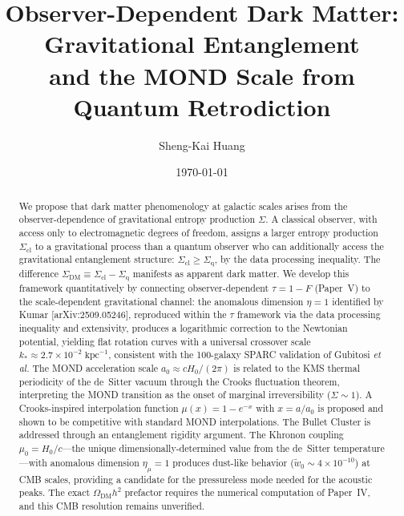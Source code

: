 \documentclass[prd,twocolumn,superscriptaddress,longbibliography,floatfix]{revtex4-2}
\newcommand{\tauasym}{\tau}
\begin{document}
\title{Observer-Dependent Dark Matter: Gravitational Entanglement\\
and the MOND Scale from Quantum Retrodiction}

\author{Sheng-Kai Huang}

\date{\today}

\begin{abstract}
We propose that dark matter phenomenology at galactic scales
arises from the observer-dependence of gravitational entropy
production $\Sigma$.
A classical observer, with access only to electromagnetic
degrees of freedom, assigns a larger entropy production
$\Sigma_{\mathrm{cl}}$ to a gravitational process than a
quantum observer who can additionally access the gravitational
entanglement structure: $\Sigma_{\mathrm{cl}} \geq
\Sigma_{\mathrm{q}}$, by the data processing inequality.
The difference $\Sigma_{\mathrm{DM}} \equiv
\Sigma_{\mathrm{cl}} - \Sigma_{\mathrm{q}}$ manifests as
apparent dark matter.
We develop this framework quantitatively by connecting
observer-dependent $\tauasym = 1 - F$ (Paper~V) to the
scale-dependent gravitational channel: the anomalous dimension
$\eta = 1$ identified by Kumar [arXiv:2509.05246], reproduced
within the $\tauasym$ framework via the data processing
inequality and extensivity, produces a logarithmic correction
to the Newtonian potential, yielding flat rotation curves with
a universal crossover scale $k_* \approx 2.7 \times 10^{-2}
\;\mathrm{kpc}^{-1}$, consistent with the 100-galaxy SPARC
validation of Gubitosi \emph{et al.}
The MOND acceleration scale $a_0 \approx
cH_0/(2\pi)$ is related to the KMS thermal periodicity of the
de~Sitter vacuum through the Crooks fluctuation theorem,
interpreting the MOND transition as the onset of marginal
irreversibility ($\Sigma \sim 1$).
A Crooks-inspired interpolation function
$\mu(x) = 1 - e^{-x}$ with $x = a/a_0$ is proposed and
shown to be competitive with standard MOND interpolations.
The Bullet Cluster is addressed through an entanglement
rigidity argument.
The Khronon coupling
$\mu_0 = H_0/c$---the unique dimensionally-determined value
from the de~Sitter temperature---with anomalous dimension
$\eta_\mu = 1$ produces dust-like behavior
($\tilde{w}_0 \sim 4 \times 10^{-10}$) at CMB scales,
providing a candidate for the pressureless mode needed for
the acoustic peaks.
The exact $\Omega_{\mathrm{DM}} h^2$ prefactor requires
the numerical computation of Paper~IV, and this CMB
resolution remains unverified.
\end{abstract}
\end{document}
